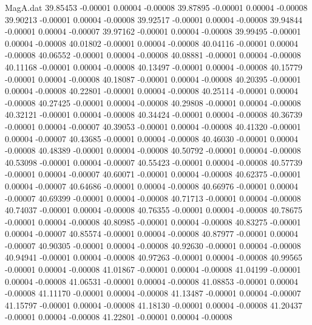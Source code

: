 \begin{filecontents}{MagA.dat}
  39.85453   -0.00001    0.00004   -0.00008
  39.87895   -0.00001    0.00004   -0.00008
  39.90213   -0.00001    0.00004   -0.00008
  39.92517   -0.00001    0.00004   -0.00008
  39.94844   -0.00001    0.00004   -0.00007
  39.97162   -0.00001    0.00004   -0.00008
  39.99495   -0.00001    0.00004   -0.00008
  40.01802   -0.00001    0.00004   -0.00008
  40.04116   -0.00001    0.00004   -0.00008
  40.06552   -0.00001    0.00004   -0.00008
  40.08881   -0.00001    0.00004   -0.00008
  40.11168   -0.00001    0.00004   -0.00008
  40.13497   -0.00001    0.00004   -0.00008
  40.15779   -0.00001    0.00004   -0.00008
  40.18087   -0.00001    0.00004   -0.00008
  40.20395   -0.00001    0.00004   -0.00008
  40.22801   -0.00001    0.00004   -0.00008
  40.25114   -0.00001    0.00004   -0.00008
  40.27425   -0.00001    0.00004   -0.00008
  40.29808   -0.00001    0.00004   -0.00008
  40.32121   -0.00001    0.00004   -0.00008
  40.34424   -0.00001    0.00004   -0.00008
  40.36739   -0.00001    0.00004   -0.00007
  40.39053   -0.00001    0.00004   -0.00008
  40.41320   -0.00001    0.00004   -0.00007
  40.43685   -0.00001    0.00004   -0.00008
  40.46030   -0.00001    0.00004   -0.00008
  40.48389   -0.00001    0.00004   -0.00008
  40.50792   -0.00001    0.00004   -0.00008
  40.53098   -0.00001    0.00004   -0.00007
  40.55423   -0.00001    0.00004   -0.00008
  40.57739   -0.00001    0.00004   -0.00007
  40.60071   -0.00001    0.00004   -0.00008
  40.62375   -0.00001    0.00004   -0.00007
  40.64686   -0.00001    0.00004   -0.00008
  40.66976   -0.00001    0.00004   -0.00007
  40.69399   -0.00001    0.00004   -0.00008
  40.71713   -0.00001    0.00004   -0.00008
  40.74037   -0.00001    0.00004   -0.00008
  40.76355   -0.00001    0.00004   -0.00008
  40.78675   -0.00001    0.00004   -0.00008
  40.80985   -0.00001    0.00004   -0.00008
  40.83275   -0.00001    0.00004   -0.00007
  40.85574   -0.00001    0.00004   -0.00008
  40.87977   -0.00001    0.00004   -0.00007
  40.90305   -0.00001    0.00004   -0.00008
  40.92630   -0.00001    0.00004   -0.00008
  40.94941   -0.00001    0.00004   -0.00008
  40.97263   -0.00001    0.00004   -0.00008
  40.99565   -0.00001    0.00004   -0.00008
  41.01867   -0.00001    0.00004   -0.00008
  41.04199   -0.00001    0.00004   -0.00008
  41.06531   -0.00001    0.00004   -0.00008
  41.08853   -0.00001    0.00004   -0.00008
  41.11170   -0.00001    0.00004   -0.00008
  41.13487   -0.00001    0.00004   -0.00007
  41.15797   -0.00001    0.00004   -0.00008
  41.18130   -0.00001    0.00004   -0.00008
  41.20437   -0.00001    0.00004   -0.00008
  41.22801   -0.00001    0.00004   -0.00008

\end{filecontents}
